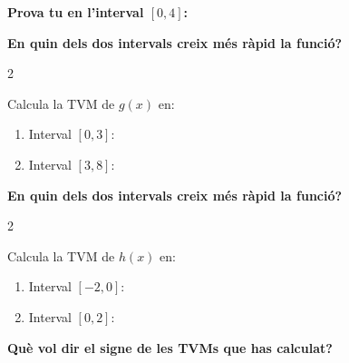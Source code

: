 \documentclass[12pt,a4paper]{article}
\begin{document}
\textbf{Prova tu en l'interval $[0, 4]$:}

\vspace{0.5cm}

\textbf{En quin dels dos intervals creix més ràpid la funció?}

\newpage

\begin{multicols}{2}
\begin{center}
\end{center}

\columnbreak
Calcula la TVM de $g(x)$ en:
\begin{enumerate}[label=\alph*)]
    \item Interval $[0, 3]$:
    \item Interval $[3, 8]$:
\end{enumerate}
\vspace{1cm}
\textbf{En quin dels dos intervals creix més ràpid la funció?}
\end{multicols}

\vspace{0.5cm}

\begin{multicols}{2}
\begin{center}
\end{center}

\columnbreak
Calcula la TVM de $h(x)$ en:
\begin{enumerate}[label=\alph*)]
    \item Interval $[-2, 0]$:
    \item Interval $[0, 2]$:
\end{enumerate}
\vspace{1cm}
\textbf{Què vol dir el signe de les TVMs que has calculat?}
\end{multicols}
\end{document}
